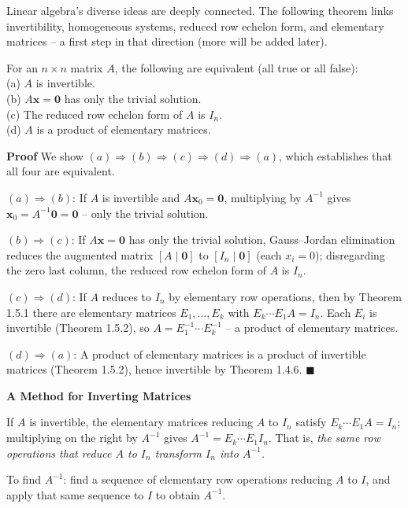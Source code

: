 \documentclass{article}
\newcommand{\redheading}[1]{{\vspace{2mm}\noindent\Large\bfseries\color{red!55!black} #1\par}\vspace{2mm}}
\theoremstyle{mystyle}
\begin{document}
Linear algebra's diverse ideas are deeply connected. The following theorem links invertibility, homogeneous systems, reduced row echelon form, and elementary matrices -- a first step in that direction (more will be added later).

\begin{tcolorbox}[colback=red!4, colframe=red!60!black, title=Theorem 1.5.3 -- Equivalent Statements, boxrule=0.5mm, arc=3mm]
For an $n\times n$ matrix $A$, the following are equivalent (all true or all false):\\
(a) $A$ is invertible.\quad \\
(b) $A\mathbf{x}=\mathbf{0}$ has only the trivial solution.\\
(c) The reduced row echelon form of $A$ is $I_n$.\quad \\
(d) $A$ is a product of elementary matrices.
\end{tcolorbox}
\textbf{Proof} We show $(a)\Rightarrow(b)\Rightarrow(c)\Rightarrow(d)\Rightarrow(a)$, which establishes that all four are equivalent.

$(a)\Rightarrow(b)$: If $A$ is invertible and $A\mathbf{x}_0=\mathbf{0}$, multiplying by $A^{-1}$ gives $\mathbf{x}_0=A^{-1}\mathbf{0}=\mathbf{0}$ -- only the trivial solution.

$(b)\Rightarrow(c)$: If $A\mathbf{x}=\mathbf{0}$ has only the trivial solution, Gauss--Jordan elimination reduces the augmented matrix $[A\mid\mathbf{0}]$ to $[I_n\mid\mathbf{0}]$ (each $x_i=0$); disregarding the zero last column, the reduced row echelon form of $A$ is $I_n$.

$(c)\Rightarrow(d)$: If $A$ reduces to $I_n$ by elementary row operations, then by Theorem 1.5.1 there are elementary matrices $E_1,\dots,E_k$ with $E_k\cdots E_1A=I_n$. Each $E_i$ is invertible (Theorem 1.5.2), so $A=E_1^{-1}\cdots E_k^{-1}$ -- a product of elementary matrices.

$(d)\Rightarrow(a)$: A product of elementary matrices is a product of invertible matrices (Theorem 1.5.2), hence invertible by Theorem 1.4.6. $\blacksquare$

\redheading{A Method for Inverting Matrices}

If $A$ is invertible, the elementary matrices reducing $A$ to $I_n$ satisfy $E_k\cdots E_1A=I_n$; multiplying on the right by $A^{-1}$ gives $A^{-1}=E_k\cdots E_1I_n$. That is, \emph{the same row operations that reduce $A$ to $I_n$ transform $I_n$ into $A^{-1}$.}

\begin{tcolorbox}[colback=blue!5, colframe=blue!60!black, title=Inversion Algorithm, boxrule=0.5mm, arc=3mm]
To find $A^{-1}$: find a sequence of elementary row operations reducing $A$ to $I$, and apply that same sequence to $I$ to obtain $A^{-1}$.
\end{tcolorbox}
\end{document}
